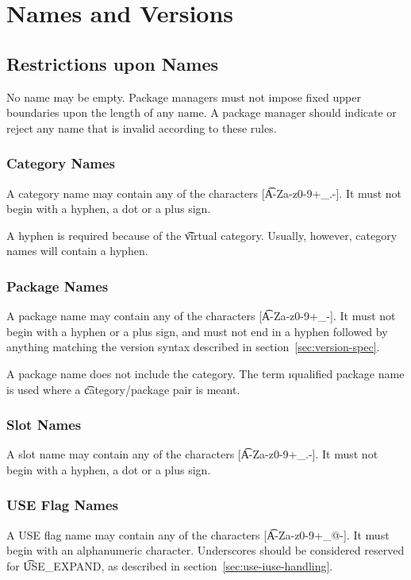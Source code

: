\chapter{Names and Versions}

\section{Restrictions upon Names}

No name may be empty. Package managers must not impose fixed upper boundaries upon the length of any
name. A package manager should indicate or reject any name that is invalid according to these rules.

\subsection{Category Names}
A category name may contain any of the characters [\t{A-Za-z0-9+\_.-}]. It must not begin with
a hyphen, a dot or a plus sign.

\note A hyphen is  required because of the \t{virtual} category. Usually, however, category
names will contain a hyphen.

\subsection{Package Names}
A package name may contain any of the characters [\t{A-Za-z0-9+\_-}]. It must not begin with a
hyphen or a plus sign, and must not end in a hyphen followed by anything matching the version
syntax described in section~\ref{sec:version-spec}.

\note A package name does not include the category. The term \i{qualified package name} is used
where a \t{category/package} pair is meant.

\subsection{Slot Names}
\label{sec:slot-names}
A slot name may contain any of the characters [\t{A-Za-z0-9+\_.-}]. It must not begin with a
hyphen, a dot or a plus sign.

\subsection{USE Flag Names}
A USE flag name may contain any of the characters [\t{A-Za-z0-9+\_@-}]. It must begin with an
alphanumeric character. Underscores should be considered reserved for \t{USE\_EXPAND}, as
described in section~\ref{sec:use-iuse-handling}.

